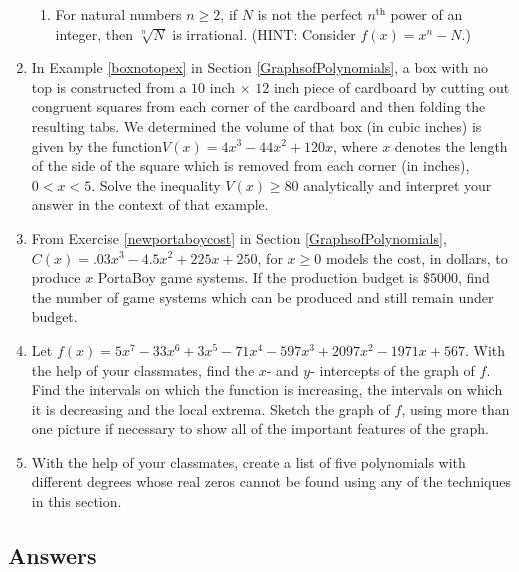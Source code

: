 \begin{enumerate}
\begin{enumerate}
\item  For natural numbers $n \geq 2$, if $N$ is not the perfect $n^{\text{th}}$ power of an integer, then $\sqrt[n]{N}$ is irrational. (HINT: Consider $f(x) = x^n-N$.)

\end{enumerate}

\item  In Example \ref{boxnotopex} in Section \ref{GraphsofPolynomials}, a box with no top is constructed from a $10$ inch $\times$ $12$ inch piece of cardboard by cutting out congruent squares from each corner of the cardboard and then folding the resulting tabs.  We determined the volume of that box (in cubic inches) is given by  the function$V(x) = 4x^3-44x^2+120x$, where $x$ denotes the length of the side of the square which is removed from each corner (in inches), $0 < x < 5$.  Solve the inequality $V(x) \geq 80$ analytically and interpret your answer in the context of that example.

\item  From Exercise \ref{newportaboycost} in Section \ref{GraphsofPolynomials}, $C(x) = .03x^{3} - 4.5x^{2} + 225x + 250$, for $x \geq 0$ models the cost, in dollars, to produce $x$ PortaBoy game systems. If the production budget is $\$5000$, find the number of game systems which can be produced and still remain under budget.

\item Let $f(x) = 5x^{7} - 33x^{6} + 3x^{5} - 71x^{4} - 597x^{3} + 2097x^{2} - 1971x + 567$.  With the help of your classmates, find the $x$- and $y$- intercepts of the graph of $f$.  Find the intervals on which the function is increasing, the intervals on which it is decreasing and the local extrema.  Sketch the graph of $f$, using more than one picture if necessary to show all of the important features of the graph.  

\item With the help of your classmates, create a list of five polynomials with different degrees whose real zeros cannot be found using any of the techniques in this section.

\setcounter{HW}{\value{enumi}}
\end{enumerate}
 



\newpage

\subsection{Answers}

